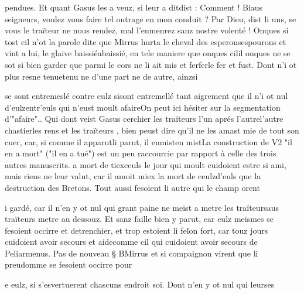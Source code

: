 \documentclass{article}
\begin{document}
\begin{pages}
                  pendues. Et quant Gasus les a veuz, si leur 
                  a ditdist : Comment ! Biaus seigneurs, voulez vous
                  faire tel outrage en mon conduit ?
               Par Dieu, dist li uns, se vous le traïteur ne nous
                  rendez, mal l’enmenrez sanz nostre volenté ! Onques si tost cil n’ot la
               parole dite que Mirrus hurta le cheval des 
                  esperonsespourons et vint a lui, le glaive 
                  baissiéabaissié, en tele maniere que 
                  onques cilil onques ne se sot si bien garder que parmi le cors ne li ait mis 
                  et ferferle fer et fust. Dont n’i ot plus resne 
                  tenuetenu ne d’une part ne de autre, 
                  ainzsi
               
                  se sont entremeslé contre eulz sisont entremellé tant aigrement que il n’i ot nul 
                  d’eulzentr'euls qui n’eust moult afaireOn peut ici hésiter sur la
                  segmentation d'"afaire".. Qui dont veist Gasus cerchier 
                  les traïteurs l’un aprés 
                        l’autrel'autre chastierles rens et les traïteurs , bien peust dire qu’il ne les amast mie de tout son cuer, car, si comme
                     il apparutli parut, il 
                     enmisten mistLa construction de V2 "il en a mort" ("il en a
                     tué") est un peu raccourcie par rapport à celle des trois autres
                     manuscrits. a mort de 
                     tiexceuls
                le jour qui moult cuidoient estre si ami, mais riens ne 
                  leur valut, car il amoit miex la mort 
                  de ceulzd'euls que la destruction des Bretons. Tout
               aussi fesoient li autre qui le champ orent 
                  
                  i gardé, car il n’en y ot nul qui grant paine ne meist 
                  a metre les traïteursaus traïteurs metre au dessouz. Et sanz faille bien y parut, car eulz meismes se fesoient occirre
               et detrenchier, et trop estoient li felon fort, 
                  car touz jours cuidoient avoir secours et aidecomme cil qui cuidoient avoir secours de Peliarmenus. \pend
            \pstart Pas de nouveau § BMirrus et si compaignon virent que li
               preudomme se fesoient occirre pour 
                  
                  e eulz, si s’esvertuerent chascuns endroit soi. Dont n’en y ot nul qui 
                  leurses
               

\end{pages}
\end{document}
